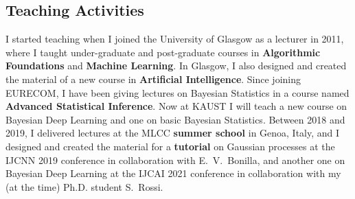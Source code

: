 \documentclass[oneside, a4paper, onecolumn, 10pt]{article}
\begin{document}



\subsection*{Teaching Activities}

I started teaching when I joined the University of Glasgow as a lecturer in 2011, where I taught under-graduate and post-graduate courses in {\bf Algorithmic Foundations} and {\bf Machine Learning}.
In Glasgow, I also designed and created the material of a new course in {\bf Artificial Intelligence}. 
Since joining EURECOM, I have been giving lectures on Bayesian Statistics in a course named {\bf Advanced Statistical Inference}.
Now at KAUST I will teach a new course on Bayesian Deep Learning and one on basic Bayesian Statistics.
Between 2018 and 2019, I delivered lectures at the MLCC {\bf summer school} in Genoa, Italy, and I designed and created the material for a {\bf tutorial} on Gaussian processes at the IJCNN 2019 conference in collaboration with E.~V.~Bonilla, and another one on Bayesian Deep Learning at the IJCAI 2021 conference in collaboration with my (at the time) Ph.D. student S.~Rossi. 

\end{document}
